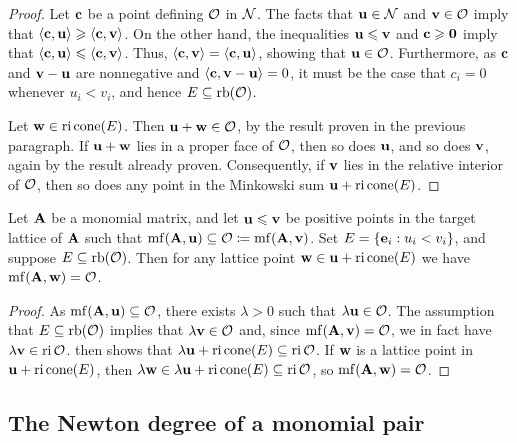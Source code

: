 \documentclass{article}
\begin{document}
\begin{proof}
   Let $\mathbf{c}$ be a point defining $\mathcal{O}$ in $\mathcal{N}$.
   The facts that $\mathbf{u} \in \mathcal{N}$ and $\mathbf{v}\in \mathcal{O}$ imply that $\langle \mathbf{c}, \mathbf{u} \rangle \geqslant \langle \mathbf{c}, \mathbf{v} \rangle$.
   On the other hand, the inequalities $\mathbf{u} \leqslant \mathbf{v}$ and $\mathbf{c} \geqslant \mathbf{0}$ imply that $\langle \mathbf{c}, \mathbf{u} \rangle \leqslant \langle \mathbf{c}, \mathbf{v} \rangle$.
   Thus, $\langle \mathbf{c}, \mathbf{v} \rangle = \langle \mathbf{c}, \mathbf{u} \rangle$, showing that $\mathbf{u} \in \mathcal{O}$.
   Furthermore, as $\mathbf{c}$ and $\mathbf{v} - \mathbf{u}$ are nonnegative and $\langle \mathbf{c}, \mathbf{v}-\mathbf{u} \rangle = 0$, it must be the case that $c_i = 0$ whenever $u_i<v_i$, and hence $E\subseteq \operatorname{rb}(\mathcal{O})$.

   Let $\mathbf{w} \in \operatorname{ri}\operatorname{cone}(E)$.
   Then $\mathbf{u}+\mathbf{w} \in \mathcal{O}$, by the result proven in the previous paragraph.
   If $\mathbf{u}+\mathbf{w}$ lies in a proper face of $\mathcal{O}$, then so does $\mathbf{u}$, and so does $\mathbf{v}$, again by the result already proven.
   Consequently, if $\mathbf{v}$ lies in the relative interior of $\mathcal{O}$, then so does any point in the Minkowski sum $\mathbf{u} + \operatorname{ri} \operatorname{cone}(E)$.
\end{proof}

\begin{corollary}
   \label{cor: a property of minimal faces}
   Let $\mathbf{A}$ be a monomial matrix, and let $\mathbf{u} \leqslant \mathbf{v}$ be positive points in the target lattice of $\mathbf{A}$ such that $\operatorname{mf}(\mathbf{A},\mathbf{u}) \subseteq \mathcal{O} \coloneqq \operatorname{mf}(\mathbf{A},\mathbf{v})$.
   Set $E = \{\mathbf{e}_i : u_i < v_i\}$, and suppose $E\subseteq \operatorname{rb}(\mathcal{O})$.
   Then for any lattice point $\mathbf{w} \in \mathbf{u} + \operatorname{ri} \operatorname{cone}(E)$ we have $\operatorname{mf}(\mathbf{A},\mathbf{w}) = \mathcal{O}$.
\end{corollary}

\begin{proof}
   As $\operatorname{mf}(\mathbf{A},\mathbf{u}) \subseteq \mathcal{O}$, there exists $\lambda > 0$ such that $\lambda\mathbf{u} \in \mathcal{O}$.
   The assumption that $E \subseteq \operatorname{rb}(\mathcal{O})$ implies that $\lambda \mathbf{v} \in \mathcal{O}$ and, since $\operatorname{mf}(\mathbf{A},\mathbf{v}) = \mathcal{O}$, we in fact have $\lambda\mathbf{v} \in \operatorname{ri}\mathcal{O}$.
    then shows that $\lambda \mathbf{u} + \operatorname{ri}\operatorname{cone}(E) \subseteq \operatorname{ri}\mathcal{O}$.
   If $\mathbf{w}$ is a lattice point in $\mathbf{u} + \operatorname{ri}\operatorname{cone}(E)$, then $\lambda\mathbf{w} \in \lambda \mathbf{u} + \operatorname{ri}\operatorname{cone}(E) \subseteq \operatorname{ri}\mathcal{O}$, so $\operatorname{mf}(\mathbf{A},\mathbf{w}) = \mathcal{O}$.
\end{proof}

\subsection{The Newton degree of a monomial pair}
\end{document}
